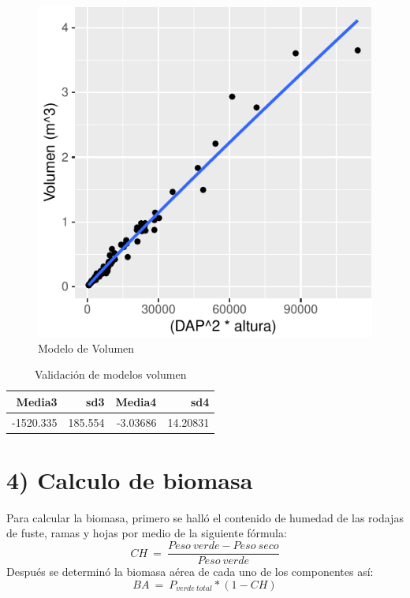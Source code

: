 \documentclass[9pt,onecolumn,twoside,]{pinp}
\begin{document}
\begin{figure}

{\centering \includegraphics{David_Londono_Lopera_Cristian_Ganan_parcial3_files/figure-latex/unnamed-chunk-10-1} 

}

\caption{Modelo de Volumen}\label{fig:unnamed-chunk-10}
\end{figure}

\begin{table}

\caption{\label{tab:unnamed-chunk-11}Validación de modelos volumen}
\centering
\begin{tabular}[t]{r|r|r|r}
\hline
Media3 & sd3 & Media4 & sd4\\
\hline
-1520.335 & 185.554 & -3.03686 & 14.20831\\
\hline
\end{tabular}
\end{table}

\hypertarget{calculo-de-biomasa}{%
\section{4) Calculo de biomasa}\label{calculo-de-biomasa}}

Para calcular la biomasa, primero se halló el contenido de humedad de
las rodajas de fuste, ramas y hojas por medio de la siguiente fórmula:
\[CH \ = \ \frac{Peso \ verde-Peso \ seco}{Peso \ verde}\] Después se
determinó la biomasa aérea de cada uno de los componentes así:
\[BA \ = \ P_{verde \ total}* (1-CH)\]
\end{document}
